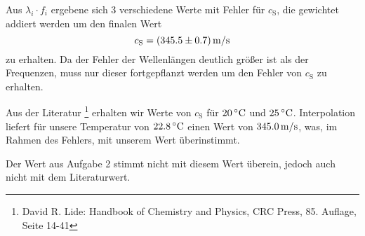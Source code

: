 Aus $\lambda_i \cdot f_i$ ergebene sich 3 verschiedene Werte mit Fehler für $c_\mathrm{S}$, die gewichtet addiert werden um den finalen Wert
\[
	c_\mathrm{S} = \unit[(345.5 \pm 0.7)]{m/s}
\]
zu erhalten.
Da der Fehler der Wellenlängen deutlich größer ist als der Frequenzen, muss nur dieser fortgepflanzt werden um den Fehler von $c_\mathrm{S}$ zu erhalten. 


Aus der Literatur%
\footnote{David R. Lide: Handbook of Chemistry and Physics, CRC Press, 85. Auflage, Seite 14-41}
erhalten wir Werte von $c_\mathrm{S}$ für $\unit[20]{ ^\circ C}$ und $\unit[25]{ ^\circ C}$. Interpolation liefert für unsere Temperatur von $\unit[22.8]{ ^\circ C}$ einen Wert von $\unit[345.0]{m/s}$, was, im Rahmen des Fehlers, mit unserem Wert überinstimmt.

Der Wert aus Aufgabe 2 stimmt nicht mit diesem Wert überein, jedoch auch nicht mit dem Literaturwert.

